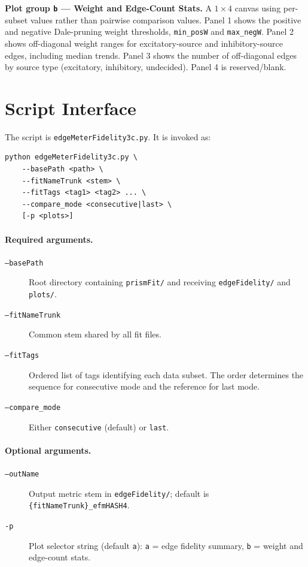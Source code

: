 \documentclass[11pt]{article}
\begin{document}
\bigskip
\noindent\textbf{Plot group \texttt{b} --- Weight and Edge-Count Stats.}
A $1 \times 4$ canvas using per-subset values rather than pairwise comparison values. Panel 1 shows the positive and negative Dale-pruning weight thresholds, \texttt{min\_posW} and \texttt{max\_negW}. Panel 2 shows off-diagonal weight ranges for excitatory-source and inhibitory-source edges, including median trends. Panel 3 shows the number of off-diagonal edges by source type (excitatory, inhibitory, undecided). Panel 4 is reserved/blank.

\section{Script Interface}
\label{sec:cli}

The script is \texttt{edgeMeterFidelity3c.py}. It is invoked as:
\begin{verbatim}
python edgeMeterFidelity3c.py \
    --basePath <path> \
    --fitNameTrunk <stem> \
    --fitTags <tag1> <tag2> ... \
    --compare_mode <consecutive|last> \
    [-p <plots>]
\end{verbatim}

\paragraph{Required arguments.}
\begin{description}
    \item[\texttt{--basePath}] Root directory containing \texttt{prismFit/} and receiving \texttt{edgeFidelity/} and \texttt{plots/}.
    \item[\texttt{--fitNameTrunk}] Common stem shared by all fit files.
    \item[\texttt{--fitTags}] Ordered list of tags identifying each data subset. The order determines the sequence for consecutive mode and the reference for last mode.
    \item[\texttt{--compare\_mode}] Either \texttt{consecutive} (default) or \texttt{last}.
\end{description}

\paragraph{Optional arguments.}
\begin{description}
    \item[\texttt{--outName}] Output metric stem in \texttt{edgeFidelity/}; default is \texttt{\{fitNameTrunk\}\_efmHASH4}.
    \item[\texttt{-p}] Plot selector string (default \texttt{a}): \texttt{a} = edge fidelity summary, \texttt{b} = weight and edge-count stats.
\end{description}
\end{document}
